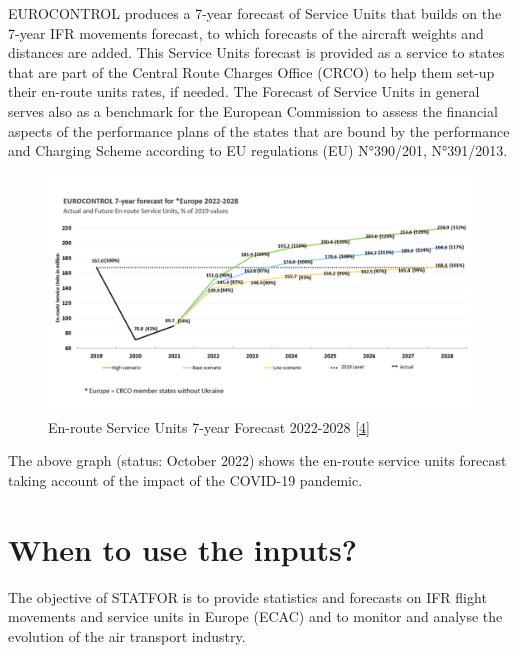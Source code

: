 \documentclass[
  11pt,
  a4paper,
]{book}
\begin{document}
EUROCONTROL produces a 7-year forecast of Service Units that builds on
the 7-year IFR movements forecast, to which forecasts of the aircraft
weights and distances are added. This Service Units forecast is provided
as a service to states that are part of the Central Route Charges Office
(CRCO) to help them set-up their en-route units rates, if needed. The
Forecast of Service Units in general serves also as a benchmark for the
European Commission to assess the financial aspects of the performance
plans of the states that are bound by the performance and Charging
Scheme according to EU regulations (EU) N°390/201, N°391/2013.

\begin{figure}

{\centering \includegraphics{chapters/../figures/forecast_service_units.png}

}

\caption{\label{fig-forecast-service-units-plot}En-route Service Units
7-year Forecast 2022-2028
\protect\hyperlink{ref-statfor:7year_forecast:2022-2028}{{[}4{]}}}

\end{figure}

The above graph (status: October 2022) shows the en-route service units
forecast taking account of the impact of the COVID-19 pandemic.

\hypertarget{when-to-use-the-inputs}{%
\section{When to use the inputs?}\label{when-to-use-the-inputs}}

The objective of STATFOR is to provide statistics and forecasts on IFR
flight movements and service units in Europe (ECAC) and to monitor and
analyse the evolution of the air transport industry.
\end{document}
